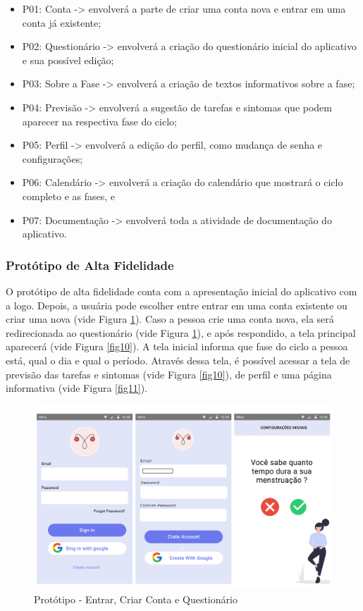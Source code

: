 \begin{itemize}
    \item P01: Conta -> envolverá a parte de criar uma conta nova e entrar em uma conta já existente;
    \item P02: Questionário -> envolverá a criação do questionário inicial do aplicativo e sua possível edição;
\item P03: Sobre a Fase -> envolverá a criação de textos informativos sobre a fase;
\item P04: Previsão -> envolverá a sugestão de tarefas e sintomas que podem aparecer na respectiva fase do ciclo;
\item P05: Perfil -> envolverá a edição do perfil, como mudança de senha e configurações;
\item P06: Calendário -> envolverá a criação do calendário que mostrará o ciclo completo e as fases, e
\item P07: Documentação -> envolverá toda a atividade de documentação do aplicativo.

\end{itemize}


\subsubsection{Protótipo de Alta Fidelidade}

O protótipo de alta fidelidade conta com a apresentação 
inicial do aplicativo com a logo. Depois, a usuária 
pode escolher entre entrar em uma conta existente ou criar 
uma nova (vide Figura \ref{fig09}). Caso a pessoa crie uma conta 
nova, ela será 
redirecionada ao questionário (vide Figura \ref{fig09}), e após 
respondido, a 
tela principal aparecerá (vide Figura \ref{fig10}). A tela inicial informa que 
fase do ciclo a pessoa está, qual o dia 
e qual o período. Através dessa tela, é possível acessar 
a tela de previsão das tarefas e sintomas (vide Figura \ref{fig10}), de perfil
e uma página informativa (vide Figura \ref{fig11}).

\begin{figure}[ht]
	\centering
	\includegraphics[keepaspectratio=true,scale=0.4]{figuras/prototipo1.pdf}
	\caption{Protótipo - Entrar, Criar Conta e Questionário}
        \label{fig09}
\end{figure}


